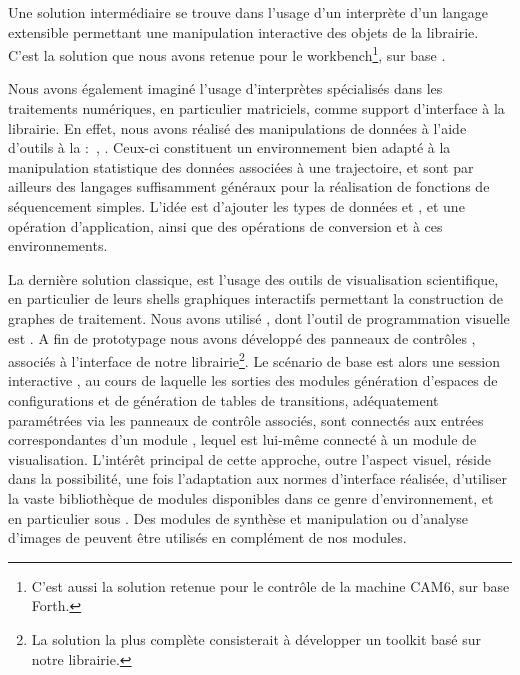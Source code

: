 Une solution intermédiaire se trouve dans l'usage d'un interprète d'un
langage extensible permettant une manipulation interactive des objets
de la librairie. %
C'est la solution que nous avons retenue pour le workbench\footnote{%
  C'est aussi la solution retenue pour le contrôle de la machine
  CAM6\cite[]{Toffoli87}, sur base Forth.}, %
sur base . %

Nous avons également imaginé l'usage d'interprètes spécialisés dans les
traitements numériques, en particulier matriciels, comme support
d'interface à la librairie. %
En effet, nous avons réalisé des manipulations de données à l'aide
d'outils à la :~,
. %
Ceux-ci constituent un envi\-ron\-nement bien adapté à la manipulation
statistique des données associées à une trajectoire, et sont par ailleurs
des langages suffisamment généraux pour la réalisation de fonctions de
séquencement simples. %
L'idée est d'ajouter les types de données  et
, et une opération d'application, ainsi que des
opérations de conversion  et
 à ces environnements.

La dernière solution classique, est l'usage des outils de
visualisation scien\-tifique, en particulier de leurs shells graphiques
interactifs permettant la construction de graphes de traitement.
Nous avons utilisé , dont l'outil de programmation
visuelle est . %
A fin de prototypage nous avons développé des panneaux de contrôles
, associés à l'interface  de notre
librairie\footnote{%
  La solution la plus complète consisterait à développer un toolkit
   basé sur notre librairie.}. %
Le scénario de base est alors une session interactive
, au cours de laquelle les sorties des modules
génération d'espaces de configurations et de génération de tables de
transitions, adéquatement paramétrées via les panneaux de contrôle
associés, sont connectés aux entrées correspondantes d'un module
, lequel est lui-même connecté à un module
de visualisation. %
L'intérêt principal de cette approche, outre l'aspect visuel, réside
dans la possibilité, une fois l'adaptation aux normes d'interface
réalisée, d'utiliser la vaste bibliothèque de modules disponibles dans
ce genre d'environnement, et en particulier sous . %
Des modules de synthèse et manipulation ou d'analyse d'images de 
peuvent être utilisés en complément de nos modules. %

